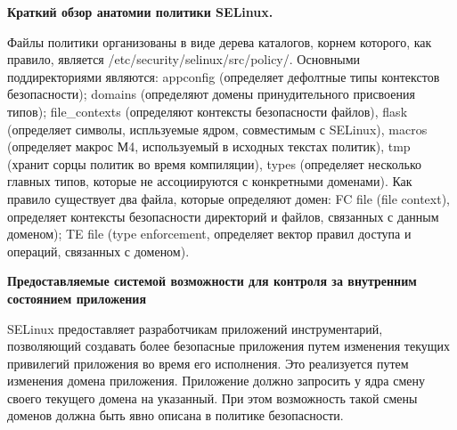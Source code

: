 \bigskip
{\bfseries Краткий обзор анатомии политики SELinux.}

Файлы политики организованы в виде дерева каталогов, 
корнем которого, как правило, является /etc/security/selinux/src/policy/. 
Основными поддиректориями являются: appconfig 
(определяет дефолтные типы контекстов безопасности); 
domains (определяют домены принудительного присвоения типов); 
file\_contexts (определяют контексты безопасности файлов), 
flask (определяет символы, испльзуемые ядром, совместимым 
с SELinux), macros (определяет макрос М4, используемый в 
исходных текстах политик), tmp (хранит сорцы политик во 
время компиляции), types (определяет несколько главных 
типов, которые не ассоциируются с конкретными доменами). 
Как правило существует два файла, которые определяют домен: 
FC file (file context), определяет контексты безопасности 
директорий и файлов, связанных с данным доменом); TE file 
(type enforcement, определяет вектор правил доступа и 
операций, связанных с доменом). 

\bigskip
{\bfseries Предоставляемые системой возможности для 
контроля за внутренним состоянием приложения} 

SELinux предоставляет разработчикам приложений 
инструментарий, позволяющий создавать более 
безопасные приложения путем изменения текущих
привилегий приложения во время его исполнения. 
Это реализуется путем изменения домена приложения. 
Приложение должно запросить у ядра смену своего 
текущего домена на указанный. При этом возможность
такой смены доменов должна быть явно описана в 
политике безопасности. 
\bigskip

